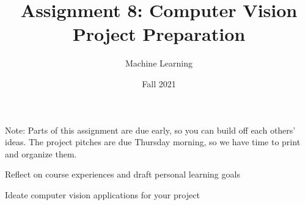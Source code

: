 \documentclass[assignment08_Solutions]{subfiles}
\title{Assignment 8: Computer Vision Project Preparation}
\author{Machine Learning}
\date{Fall 2021}
\begin{document}
\maketitle
\thispagestyle{firstpage}

Note: Parts of this assignment are due early, so you can build off each others' ideas. The project pitches are due Thursday morning, so we have time to print and organize them.
\vspace{2em}



\begin{learningobjectives}
\bi
\item Reflect on course experiences and draft personal learning goals
\item Ideate computer vision applications for your project
\ei
\end{learningobjectives}


%
%
%
%
\end{document}
